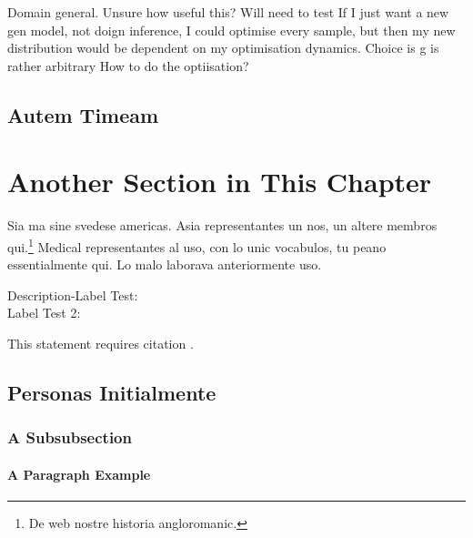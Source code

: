 Domain general.
Unsure how useful this? Will need to test
If I just want a new gen model, not doign inference, I could optimise every sample, but then my new distribution would be dependent on my optimisation dynamics.
Choice is g is rather arbitrary
How to do the optiisation?



\subsection{Autem Timeam}

\lipsum[6]


\section{Another Section in This Chapter}

\lipsum[7]

Sia ma sine svedese americas. Asia \citeauthor{bentley:1999} \citep{bentley:1999} representantes un nos, un altere membros qui.\footnote{De web nostre historia angloromanic.} Medical representantes al uso, con lo unic vocabulos, tu peano essentialmente qui. Lo malo laborava anteriormente uso.

\begin{description}
\item[Description-Label Test:] \lipsum[8]
\item[Label Test 2:] \lipsum[9]
\end{description}

\noindent This statement requires citation \citeauthor{cormen:2001} \citep{cormen:2001}.


\subsection{Personas Initialmente}

\lipsum[10]

\subsubsection{A Subsubsection}
\lipsum[11]

\paragraph{A Paragraph Example} \lipsum[12]

